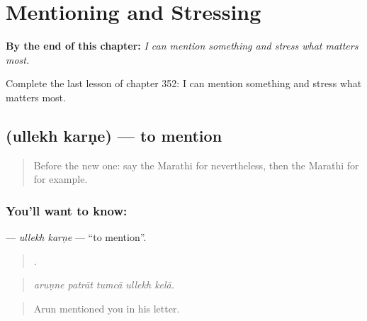 
\chapter{Mentioning and Stressing}
\label{ch:mr-mentioning-and-stressing}

\begin{chapteropening}
\textbf{By the end of this chapter:} \emph{I can mention something and stress what matters most.}

Complete the last lesson of chapter 352: I can mention something and stress what matters most.
\end{chapteropening}

\section[\texorpdfstring{\mr{उल्लेख} \mr{करणे} (ullekh karṇe)}{उल्लेख करणे (ullekh karṇe)}]{  (ullekh karṇe) — to mention}

\label{lesson:MR-C352-ullekh-karne}



\begin{quote}
Before the new one: say the Marathi for nevertheless, then the Marathi for for example.
\end{quote}

\subsection*{You'll want to know:  }
\textbf{ } — \emph{ullekh karṇe} — \textquotedblleft{}to mention\textquotedblright{}.

\begin{quote}
    .
\end{quote}

\begin{quote}
\emph{aruṇne patrāt tumcā ullekh kelā.}
\end{quote}

\begin{quote}
Arun mentioned you in his letter.
\end{quote}

